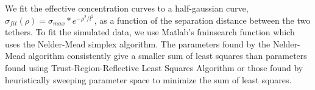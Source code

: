 \documentclass[../../AdvancementSummary.tex]{subfiles}
\begin{document}
We fit the effective concentration curves to a half-gaussian curve, $\sigma_{fit}(\rho) = \sigma_{max}*e^{-\rho^2/l^2}$, as a function of the separation distance between the two tethers. To fit the simulated data, we use Matlab's fminsearch function which uses the Nelder-Mead simplex algorithm. The parameters found by the Nelder-Mead algorithm consistently give a smaller sum of least squares than parameters found using Trust-Region-Reflective Least Squares Algorithm or those found by heuristically sweeping parameter space to minimize the sum of least squares.


%
%
%
%
%
%
\end{document}
